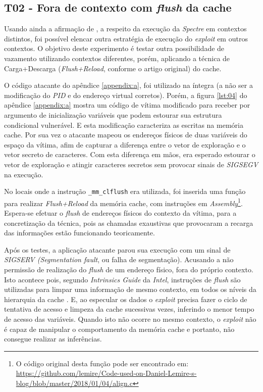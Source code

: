 \documentclass[
	article,			    %
	12pt,				    %
	oneside,			    %
	a4paper,			    %
	chapter=TITLE,		    %
	section=TITLE,		    %
	subsection=TITLE,	    %
	english,			    %
	brazil,				    %
	sumario=tradicional
]{abntex2}
\begin{document}
\subsection{T02 - Fora de contexto com \emph{flush} da cache}
Usando ainda a afirmação de , a respeito da execução da \emph{Spectre} em contextos distintos, foi possível elencar outra estratégia de execução do \emph{exploit} em outros contextos. O objetivo deste experimento é testar outra possibilidade de vazamento utilizando contextos diferentes, porém, aplicando a técnica de Carga+Descarga (\emph{Flush+Reload}, conforme o artigo original) do cache.

O código atacante do apêndice \ref{appendix:a}, foi utilizado na íntegra (a não ser a modificação do \emph{PID} e do endereço virtual corretos). Porém, a figura \ref{lst:04} do apêndice \ref{appendix:a} mostra um código de vítima modificado para receber por argumento de inicialização variáveis que podem estourar sua estrutura condicional vulnerável. E esta modificação caracteriza as escritas na memória cache. Por sua vez o atacante mapeou os endereços físicos de duas variáveis do espaço da vítima, afim de capturar a diferença entre o vetor de exploração e o vetor secreto de caracteres. Com esta diferença em mãos, era esperado estourar o vetor de exploração e atingir caracteres secretos sem provocar sinais de \emph{SIGSEGV} na execução.

No locais onde a instrução \lstinline[language=C, style=c]{_mm_clflush} era utilizada, foi inserida uma função para realizar \emph{Flush+Reload} da memória cache, com instruções em \emph{Assembly}\footnote{O código original desta função pode ser encontrado em: \url{https://github.com/lemire/Code-used-on-Daniel-Lemire-s-blog/blob/master/2018/01/04/align.c}}. Espera-se efetuar o \emph{flush} de endereços físicos do contexto da vítima, para a concretização da técnica, pois as chamadas exaustivas que provocaram a recarga das informações estão funcionando teoricamente.

Após os testes, a aplicação atacante parou sua execução com um sinal de \emph{SIGSERV (Segmentation fault}, ou falha de segmentação). Acusando a não permissão de realização do \emph{flush} de um endereço físico, fora do próprio contexto. Isto acontece pois, segundo \emph{Intrinsics Guide} da \emph{Intel}, instruções de \emph{flush} são utilizadas para limpar uma informação de mesmo contexto, em todos os níveis da hierarquia da cache \cite{Intel2018Intrinsics}. E, ao especular os dados o \emph{exploit} precisa fazer o ciclo de tentativa de acesso e limpeza da cache sucessivas vezes, inferindo o menor tempo de acesso das variáveis. Quando isto não ocorre no mesmo contexto, o \emph{exploit} não é capaz de manipular o comportamento da memória cache e portanto, não consegue realizar as inferências.
\end{document}

